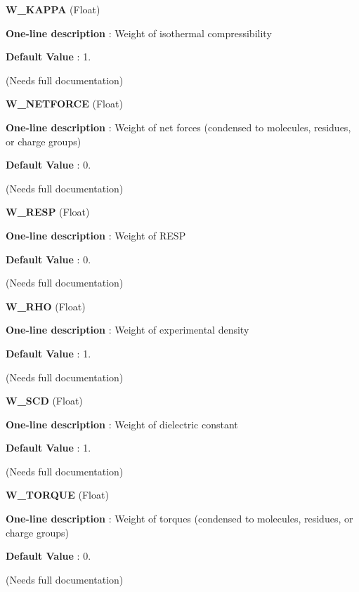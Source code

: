 \begin{DoxyItemize}
\item {\bfseries  W\-\_\-\-K\-A\-P\-P\-A } (Float) \par
{\bfseries  One-\/line description }\-: Weight of isothermal compressibility \par
{\bfseries  Default Value }\-: 1. \par
(Needs full documentation)\end{DoxyItemize}
\begin{DoxyItemize}
\item {\bfseries  W\-\_\-\-N\-E\-T\-F\-O\-R\-C\-E } (Float) \par
{\bfseries  One-\/line description }\-: Weight of net forces (condensed to molecules, residues, or charge groups) \par
{\bfseries  Default Value }\-: 0. \par
(Needs full documentation)\end{DoxyItemize}
\begin{DoxyItemize}
\item {\bfseries  W\-\_\-\-R\-E\-S\-P } (Float) \par
{\bfseries  One-\/line description }\-: Weight of R\-E\-S\-P \par
{\bfseries  Default Value }\-: 0. \par
(Needs full documentation)\end{DoxyItemize}
\begin{DoxyItemize}
\item {\bfseries  W\-\_\-\-R\-H\-O } (Float) \par
{\bfseries  One-\/line description }\-: Weight of experimental density \par
{\bfseries  Default Value }\-: 1. \par
(Needs full documentation)\end{DoxyItemize}
\begin{DoxyItemize}
\item {\bfseries  W\-\_\-\-S\-C\-D } (Float) \par
{\bfseries  One-\/line description }\-: Weight of dielectric constant \par
{\bfseries  Default Value }\-: 1. \par
(Needs full documentation)\end{DoxyItemize}
\begin{DoxyItemize}
\item {\bfseries  W\-\_\-\-T\-O\-R\-Q\-U\-E } (Float) \par
{\bfseries  One-\/line description }\-: Weight of torques (condensed to molecules, residues, or charge groups) \par
{\bfseries  Default Value }\-: 0. \par
(Needs full documentation)\end{DoxyItemize}
